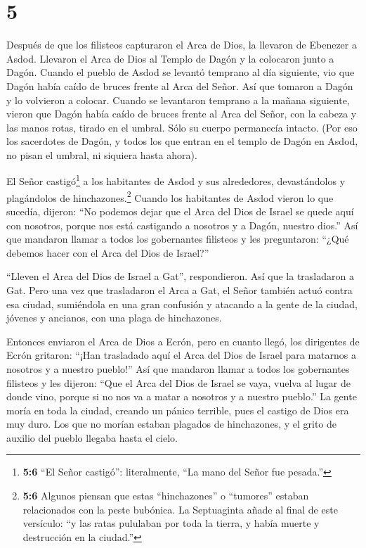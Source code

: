 \hypertarget{section-4}{%
\section{5}\label{section-4}}

 Después de que los filisteos capturaron el Arca de Dios, la
llevaron de Ebenezer a Asdod.  Llevaron el Arca de Dios al
Templo de Dagón y la colocaron junto a Dagón.  Cuando el
pueblo de Asdod se levantó temprano al día siguiente, vio que Dagón
había caído de bruces frente al Arca del Señor. Así que tomaron a Dagón
y lo volvieron a colocar.  Cuando se levantaron temprano a
la mañana siguiente, vieron que Dagón había caído de bruces frente al
Arca del Señor, con la cabeza y las manos rotas, tirado en el umbral.
Sólo su cuerpo permanecía intacto.  (Por eso los sacerdotes
de Dagón, y todos los que entran en el templo de Dagón en Asdod, no
pisan el umbral, ni siquiera hasta ahora).

 El Señor castigó\footnote{\textbf{5:6} ``El Señor
  castigó'': literalmente, ``La mano del Señor fue pesada.''} a los
habitantes de Asdod y sus alrededores, devastándolos y plagándolos de
hinchazones.\footnote{\textbf{5:6} Algunos piensan que estas
  ``hinchazones'' o ``tumores'' estaban relacionados con la peste
  bubónica. La Septuaginta añade al final de este versículo: ``y las
  ratas pululaban por toda la tierra, y había muerte y destrucción en la
  ciudad.''}  Cuando los habitantes de Asdod vieron lo que
sucedía, dijeron: ``No podemos dejar que el Arca del Dios de Israel se
quede aquí con nosotros, porque nos está castigando a nosotros y a
Dagón, nuestro dios.''  Así que mandaron llamar a todos los
gobernantes filisteos y les preguntaron: ``¿Qué debemos hacer con el
Arca del Dios de Israel?''

``Lleven el Arca del Dios de Israel a Gat'', respondieron. Así que la
trasladaron a Gat.  Pero una vez que trasladaron el Arca a
Gat, el Señor también actuó contra esa ciudad, sumiéndola en una gran
confusión y atacando a la gente de la ciudad, jóvenes y ancianos, con
una plaga de hinchazones.

 Entonces enviaron el Arca de Dios a Ecrón, pero en cuanto
llegó, los dirigentes de Ecrón gritaron: ``¡Han trasladado aquí el Arca
del Dios de Israel para matarnos a nosotros y a nuestro pueblo!''
 Así que mandaron llamar a todos los gobernantes filisteos
y les dijeron: ``Que el Arca del Dios de Israel se vaya, vuelva al lugar
de donde vino, porque si no nos va a matar a nosotros y a nuestro
pueblo.'' La gente moría en toda la ciudad, creando un pánico terrible,
pues el castigo de Dios era muy duro.  Los que no morían
estaban plagados de hinchazones, y el grito de auxilio del pueblo
llegaba hasta el cielo.

